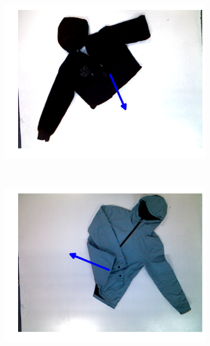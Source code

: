 \begin{figure}[htbp]
	\centering
    \begin{subfigure}[l]{0.49\textwidth}
	    \centering
    	\includegraphics[width=\textwidth]
    	{figures/pnp/hoodie16-direction.pdf}
	\end{subfigure}
	~
    \begin{subfigure}[r]{0.49\textwidth}
	    \centering
    	\includegraphics[width=\textwidth]
    	{figures/pnp/jacket15-direction.pdf}
	\end{subfigure} 
	~
	\begin{subfigure}[l]{0.49\textwidth}
	    \centering

\end{subfigure}
\end{figure}
